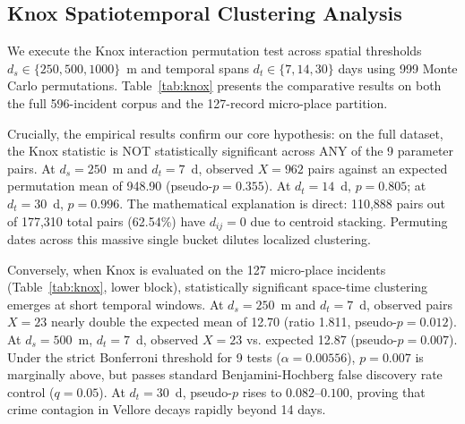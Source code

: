 \documentclass[conference]{IEEEtran}
\begin{document}
\subsection{Knox Spatiotemporal Clustering Analysis}
We execute the Knox interaction permutation test across spatial thresholds $d_s \in \{250, 500, 1000\}$~m and temporal spans $d_t \in \{7, 14, 30\}$ days using 999 Monte Carlo permutations. Table~\ref{tab:knox} presents the comparative results on both the full 596-incident corpus and the 127-record micro-place partition.

Crucially, the empirical results confirm our core hypothesis: on the full dataset, the Knox statistic is NOT statistically significant across ANY of the 9 parameter pairs. At $d_s = 250$~m and $d_t = 7$~d, observed $X = 962$ pairs against an expected permutation mean of 948.90 (pseudo-$p = 0.355$). At $d_t = 14$~d, $p = 0.805$; at $d_t = 30$~d, $p = 0.996$. The mathematical explanation is direct: 110,888 pairs out of 177,310 total pairs (62.54\%) have $d_{ij} = 0$ due to centroid stacking. Permuting dates across this massive single bucket dilutes localized clustering.

Conversely, when Knox is evaluated on the 127 micro-place incidents (Table~\ref{tab:knox}, lower block), statistically significant space-time clustering emerges at short temporal windows. At $d_s = 250$~m and $d_t = 7$~d, observed pairs $X = 23$ nearly double the expected mean of 12.70 (ratio 1.811, pseudo-$p = 0.012$). At $d_s = 500$~m, $d_t = 7$~d, observed $X = 23$ vs. expected 12.87 (pseudo-$p = 0.007$). Under the strict Bonferroni threshold for 9 tests ($\alpha = 0.00556$), $p = 0.007$ is marginally above, but passes standard Benjamini-Hochberg false discovery rate control ($q = 0.05$). At $d_t = 30$~d, pseudo-$p$ rises to $0.082\text{--}0.100$, proving that crime contagion in Vellore decays rapidly beyond 14 days.
\end{document}
